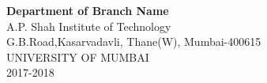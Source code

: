 \begin{titlepage}
{\hspace{.05cm}
\hspace{.05cm}

{\textbf {Department of Branch Name}}\\
A.P. Shah Institute of Technology\\
G.B.Road,Kasarvadavli, Thane(W), Mumbai-400615\\
UNIVERSITY OF MUMBAI\\
2017-2018\\}
\end{titlepage}